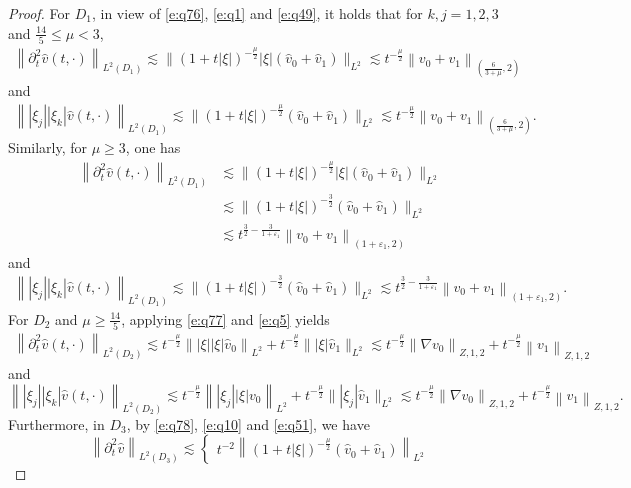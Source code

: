\documentclass[11pt,twoside]{article}
\newcommand{\p}{\partial}
\newcommand{\f}{\frac}
\theoremstyle{plain}
\theoremstyle{definition}
\theoremstyle{remark}
\numberwithin{equation}{section}
\begin{document}
\begin{proof}
For $D_1$, in view of  \eqref{e:q76}, \eqref{e:q1} and \eqref{e:q49}, it holds that for  $k,j=1,2,3$ and $\f{14}{5}\leq\mu<3$,
$$
\begin{aligned}
\left\|\p_t^2\hat{v}(t, \cdot)\right\|_{L^2(D_1)}
\lesssim \big\|(1+t|\xi|)^{-\f{\mu}{2}}|\xi|(\hat{v}_{0}+\hat{v}_{1})\big\|_{L^{2}}
\lesssim t^{-\f{\mu}{2}}\left\|v_0+v_1\right\|_{(\f{6}{3+\mu},2)}
\end{aligned}
$$
and
$$
\begin{aligned}
\left\||\xi_j||\xi_k|\hat{v}(t, \cdot)\right\|_{L^2(D_1)}
\lesssim \big\|(1+t|\xi|)^{-\f{\mu}{2}}(\hat{v}_{0}+\hat{v}_{1})\big\|_{L^{2}}
\lesssim t^{-\f{\mu}{2}}\left\|v_0+v_1\right\|_{(\f{6}{3+\mu},2)}.
\end{aligned}
$$
Similarly, for $\mu\geq3$, one has
$$
\begin{aligned}
\left\|\p_t^2\hat{v}(t, \cdot)\right\|_{L^2(D_1)}
&\lesssim \big\|(1+t|\xi|)^{-\f{\mu}{2}}|\xi|(\hat{v}_{0}+\hat{v}_{1})\big\|_{L^{2}} \\
&\lesssim \big\|(1+t|\xi|)^{-\f{3}{2}}(\hat{v}_{0}+\hat{v}_{1})\big\|_{L^{2}} \\
&
\lesssim t^{\f32-\f{3}{1+\varepsilon_1}}\left\|v_0+v_1\right\|_{(1+\varepsilon_1,2)}
\end{aligned}
$$
and
$$
\begin{aligned}
\left\||\xi_j||\xi_k|\hat{v}(t, \cdot)\right\|_{L^2(D_1)}
\lesssim \big\|(1+t|\xi|)^{-\f{3}{2}}(\hat{v}_{0}+\hat{v}_{1})\big\|_{L^{2}}
\lesssim t^{\f32-\f{3}{1+\varepsilon_1}}\left\|v_0+v_1\right\|_{(1+\varepsilon_1,2)}.
\end{aligned}
$$
For $D_2$ and $\mu\geq\f{14}{5}$, applying \eqref{e:q77} and \eqref{e:q5} yields
$$
\begin{aligned}
\left\|\p_t^2\hat{v}(t, \cdot)\right\|_{L^2(D_2)}
\lesssim t^{-\frac{\mu}{2}}\left\||\xi||\xi|\hat{v}_{0}\right\|_{L^{2}}+t^{-\f{\mu}{2}} \||\xi|\hat{v}_{1}\|_{L^{2}}\lesssim t^{-\f{\mu}{2}}\left\|\nabla v_0\right\|_{Z, 1, 2}+t^{-\f{\mu}{2}}\left\|v_1\right\|_{Z,1,2}
\end{aligned}
$$
and
$$
\left\||\xi_j||\xi_k|\hat{v}(t, \cdot)\right\|_{L^2(D_2)}\lesssim t^{-\frac{\mu}{2}}\left\||\xi_j||\xi|v_{0}\right\|_{L^{2}}+t^{-\f{\mu}{2}} \||\xi_j|\hat{v}_{1}\|_{L^{2}}\lesssim t^{-\f{\mu}{2}}\left\|\nabla v_0\right\|_{Z, 1, 2}+t^{-\f{\mu}{2}}\left\|v_1\right\|_{Z,1,2}.
$$
Furthermore, in $D_3$, by \eqref{e:q78}, \eqref{e:q10} and \eqref{e:q51}, we have
$$
\left\|\p_t^2\hat{v}\right\|_{L^2(D_3)}\lesssim \begin{cases} t^{-2}\left\|(1+t|\xi|)^{-\f{\mu}{2}}(\hat{v}_{0}+\hat{v}_{1})\right\|_{L^{2}}

\end{cases}$$
\end{proof}
\end{document}
